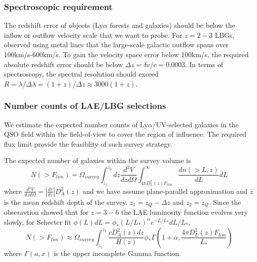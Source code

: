 \documentclass[useAMS,usenatbib,twocolumn]{mn2e}
\newcommand{\LyA}{\mbox{Ly}\alpha}
\begin{document}
\subsubsection{Spectroscopic requirement}
The redshift error of objects ($\LyA$ forests and galaxies) should
be below the inflow or outflow velocity scale that we want to probe.
For $z=2-3$ LBGs, \cite{2010ApJ...717..289S} observed using metal lines that the large-scale
galactic outflow spans over 100km/s-600km/s. To gain the velocity space error
below 100km/s, the required absolute redshift error should be below 
$\Delta z=\delta v/c=0.0003$. In terms of spectroscopy, the spectral
resolution should exceed $R=\lambda/\Delta\lambda=(1+z)/\Delta z\approx
3000(1+z)$.


\subsubsection{Number counts of LAE/LBG selections}

We estimate the expected number counts of $\LyA$/UV-selected galaxies 
in the QSO field within the field-of-view to cover the region of influence.
The required flux limit provide the feasiblity of such survey strategy. 

The expected number of galaxies within the survey volume is
\begin{equation}
N(>F_{lim})=\Omega_{survey}\int_{z_1}^{z_2} dz\frac{d^2V}{dzd\Omega}\int_{4\pi D_L^2(z)F_{lim}}^\infty
\frac{dn(>L,z)}{dL}dL
\end{equation}
where $\frac{d^2V}{dzd\Omega}=\left|\frac{dr}{dz}\right|D_A^2(z)$ and
we have assume plane-parallel approximation and $\bar{z}$ is the mean
redshift depth of the survey. $z_1=z_Q-\Delta z$ and $z_2=z_Q$. Since the obseravtion
showed that for $z=3-6$ the LAE luminosity function evolves very slowly,
for Schecter fit $\phi(L)dL=\phi_\ast(L/L_\ast)^{\alpha}e^{-L/L_\ast}dL/L_\ast$,
\begin{equation}
N(>F_{lim})\approx\Omega_{survey}
\int_{z_1}^{z_2}\frac{cD_A^2(z)dz}{H(z)}
\phi_\ast \Gamma\left(1+\alpha,\frac{4\pi D_L^2(z)F_{lim}}{L_\ast}\right)
\end{equation}
where $\Gamma(a,x)$ is the upper incomplete Gamma function.
\end{document}
